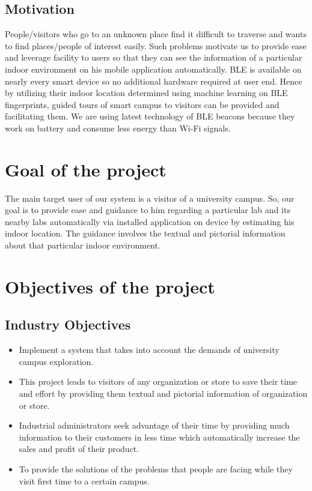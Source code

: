 \documentclass{article}
\begin{document}
\subsection{Motivation}
People/visitors who go to an unknown place find it difficult to traverse and wants to find places/people of interest easily. Such problems motivate us to provide ease and leverage facility to users so that they can see the information of a particular indoor environment on his mobile application automatically. BLE is available on nearly every smart device so no additional hardware required at user end. Hence by utilizing their indoor location determined using machine learning on BLE fingerprints, guided tours of smart campus to visitors can be provided and facilitating them. We are using latest technology of BLE beacons because they work on battery and consume less energy than Wi-Fi signals.\cite{research3}
\section{Goal of the project}
The main target user of our system is a visitor of a university campus. So, our goal is to provide ease and guidance to him regarding a particular lab and its nearby labs automatically via installed application on device by estimating his indoor location. The guidance involves the textual and pictorial information about that particular indoor environment.
\section{Objectives of the project}
\subsection{Industry Objectives}
\begin{itemize}
\item Implement a system that takes into account the demands of university campus exploration.
\item This project leads to visitors of any organization or store to save their time and effort by providing them textual and pictorial information of organization or store.
\item Industrial administrators seek advantage of their time by providing much information to their customers in less time which automatically increase the sales and profit of their product.
\item To provide the solutions of the problems that people are facing while they visit first time to a certain campus.


\end{itemize}
\end{document}
